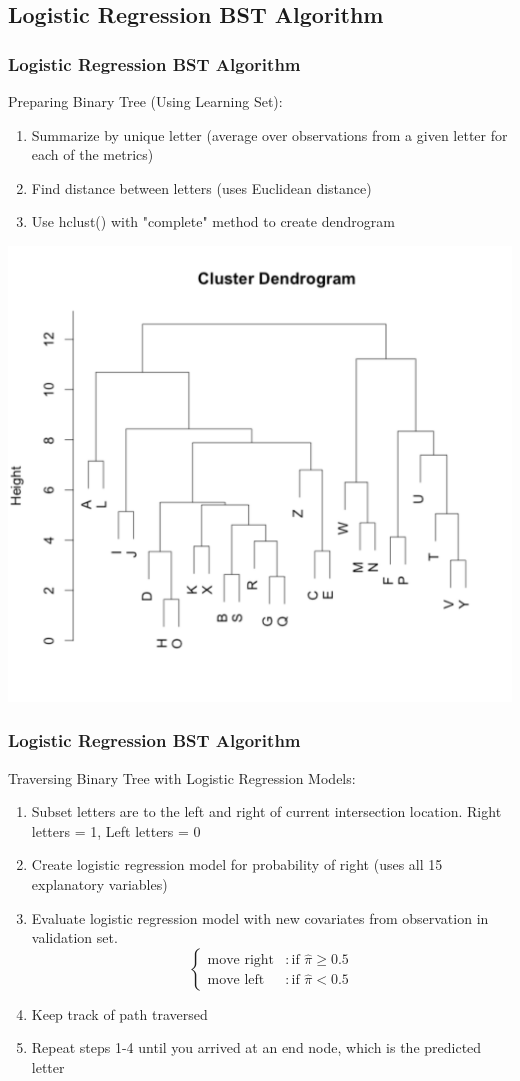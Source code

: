 \documentclass{beamer}
\begin{document}
\subsection{Logistic Regression BST Algorithm}
\begin{frame}
\frametitle{Logistic Regression BST Algorithm}
Preparing Binary Tree (Using Learning Set):
\begin{enumerate}
\item \small{Summarize by unique letter (average over observations from a given letter for each of the metrics)}
\item \small{Find distance between letters (uses Euclidean distance)}
\item \small{Use hclust() with "complete" method to create dendrogram}
\end{enumerate}
\begin{center} 
\includegraphics[width=.45 \textwidth]{letterDendrogram}
\end{center}
\end{frame}

\begin{frame}
\frametitle{Logistic Regression BST Algorithm}
Traversing Binary Tree with Logistic Regression Models:
\begin{enumerate}
\item \small{Subset letters are to the left and right of current intersection location.} \small{Right letters = 1, Left letters = 0}
\item \small{Create logistic regression model for probability of right (uses all 15 explanatory variables)}
\item \small{Evaluate logistic regression model with new covariates from observation in validation set. }
 \begin{displaymath}
\left\{
     \begin{array}{lr}
       \text{move right} & : \text{if } \hat{\pi} \geq 0.5\\
      \text{move left} & : \text{if } \hat{\pi} < 0.5
     \end{array}
   \right.
\end{displaymath} 
\item \small{Keep track of path traversed}
\item \small{Repeat steps 1-4 until you arrived at an end node, which is the predicted letter}
\end{enumerate}

\end{frame}
\end{document}
